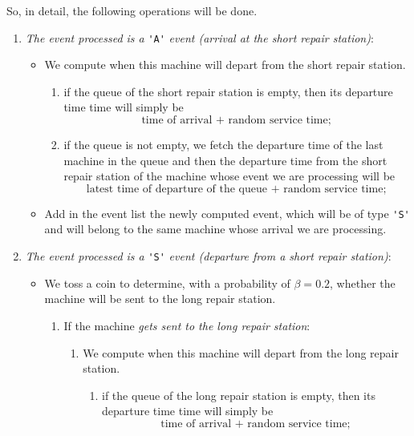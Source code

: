 \documentclass[12pt]{article}
\begin{document}
So, in detail, the following operations will be done.
\begin{enumerate}[\circnum]
	\item \emph{The event processed is a} \verb*|'A'| \emph{event (arrival at the short repair station)}:
	\begin{itemize}
		\item We compute when this machine will depart from the short repair station.
		\begin{enumerate}
			\item if the queue of the short repair station is empty, then its departure time time will simply be
			\begin{equation*}
				\text{time of arrival + random service time};
			\end{equation*}
			\item if the queue is not empty, we fetch the departure time of the last machine in the queue and then the departure time from the short repair station of the machine whose event we are processing will be
			\begin{equation*}
				\text{latest time of departure of the queue + random service time};
			\end{equation*}
		\end{enumerate}
		\item Add in the event list the newly computed event, which will be of type \verb*|'S'| and will belong to the same machine whose arrival we are processing.
	\end{itemize} 
	\item \emph{The event processed is a }\verb*|'S'|\emph{ event (departure from a short repair station)}:
	\begin{itemize}
		\item We toss a coin to determine, with a probability of $\beta=0.2$, whether the machine will be sent to the long repair station.
		\begin{enumerate}
			\item If the machine \textit{gets sent to the long repair station}:
			\begin{enumerate}
				\item We compute when this machine will depart from the long repair station.
				\begin{enumerate}
					\item if the queue of the long repair station is empty, then its departure time time will simply be
					\begin{equation*}
						\text{time of arrival + random service time};

\end{equation*}
\end{enumerate}
\end{enumerate}
\end{enumerate}
\end{itemize}
\end{enumerate}
\end{document}
